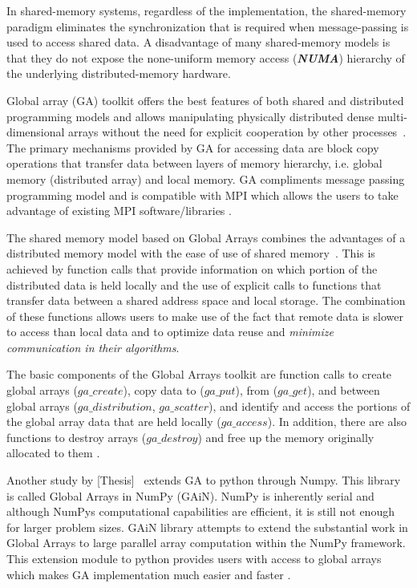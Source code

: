 In shared-memory systems, regardless of the implementation, the shared-memory paradigm eliminates the synchronization that is required when message-passing is used to access shared data. 
A disadvantage of many shared-memory models is that they do not expose the none-uniform memory access (\textbf{\textit{NUMA}}) hierarchy of the underlying distributed-memory hardware. 

Global array (GA) toolkit offers the best features of both shared and distributed programming models and allows manipulating physically distributed dense multi-dimensional arrays without the need for explicit cooperation by other processes~.
The primary mechanisms provided by GA for accessing data are block copy operations that transfer data between layers of memory hierarchy, i.e. global memory (distributed array) and local memory. 
GA compliments message passing programming model and is compatible with MPI which allows the users to take advantage of existing MPI software/libraries \cite{GA}.

The shared memory model based on Global Arrays combines the advantages of a distributed memory model with the ease of use of shared memory~. 
This is achieved by function calls that provide information on which portion of the distributed data is held locally and the use of explicit calls to functions that transfer data between a shared address space and local storage. 
The combination of these functions allows users to make use of the fact that remote data is slower to access than local data and to optimize data reuse and \emph{minimize communication in their algorithms}.

The basic components of the Global Arrays toolkit are function calls to create global arrays ($ga\_create$), copy data to ($ga\_put$), from ($ga\_get$), and between global arrays ($ga\_distribution$, $ga\_scatter$), and identify and access the portions of the global array data that are held locally ($ga\_access$). 
In addition, there are also functions to destroy arrays ($ga\_destroy$) and free up the memory originally allocated to them \cite{GAiN}.

Another study by [Thesis]~ extends GA to python through Numpy. This library is called Global Arrays in NumPy (GAiN).
NumPy is inherently serial and although NumPy\textsc{}s computational capabilities are efficient, it is still not enough for larger problem sizes. 
GAiN library attempts to extend the substantial work in Global Arrays to large parallel array computation within the NumPy framework.
This extension module to python provides users with access to global arrays which makes GA implementation much easier and faster \cite{GAiN}. 

